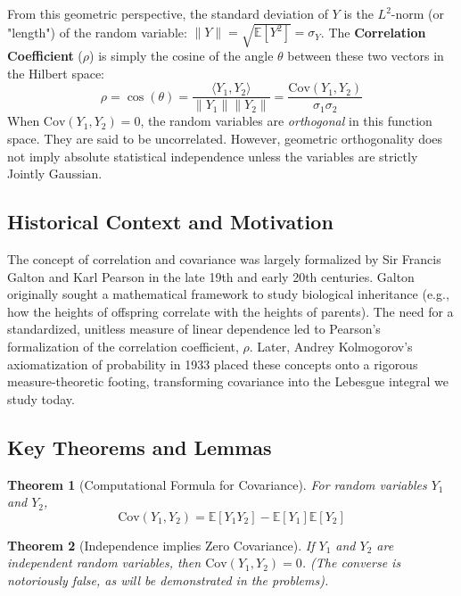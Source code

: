 \documentclass[11pt, a4paper]{article}
\newtheorem{theorem}{Theorem}[section]
\theoremstyle{definition}
\theoremstyle{remark}
\newcommand{\E}{\mathbb{E}}
\newcommand{\Cov}{\mathrm{Cov}}
\begin{document}
From this geometric perspective, the standard deviation of $Y$ is the $L^2$-norm (or "length") of the random variable: $\|Y\| = \sqrt{\E[Y^2]} = \sigma_Y$. The \textbf{Correlation Coefficient} ($\rho$) is simply the cosine of the angle $\theta$ between these two vectors in the Hilbert space:
\[
\rho = \cos(\theta) = \frac{\langle Y_1, Y_2 \rangle}{\|Y_1\| \|Y_2\|} = \frac{\Cov(Y_1, Y_2)}{\sigma_1 \sigma_2}
\]
When $\Cov(Y_1, Y_2) = 0$, the random variables are \textit{orthogonal} in this function space. They are said to be uncorrelated. However, geometric orthogonality does not imply absolute statistical independence unless the variables are strictly Jointly Gaussian.

\subsection{Historical Context and Motivation}
The concept of correlation and covariance was largely formalized by Sir Francis Galton and Karl Pearson in the late 19th and early 20th centuries. Galton originally sought a mathematical framework to study biological inheritance (e.g., how the heights of offspring correlate with the heights of parents). The need for a standardized, unitless measure of linear dependence led to Pearson's formalization of the correlation coefficient, $\rho$. Later, Andrey Kolmogorov's axiomatization of probability in 1933 placed these concepts onto a rigorous measure-theoretic footing, transforming covariance into the Lebesgue integral we study today.

\subsection{Key Theorems and Lemmas}
\begin{theorem}[Computational Formula for Covariance]
For random variables $Y_1$ and $Y_2$,
\[
\Cov(Y_1, Y_2) = \E[Y_1 Y_2] - \E[Y_1]\E[Y_2]
\]
\end{theorem}

\begin{theorem}[Independence implies Zero Covariance]
If $Y_1$ and $Y_2$ are independent random variables, then $\Cov(Y_1, Y_2) = 0$. (The converse is notoriously false, as will be demonstrated in the problems).
\end{theorem}
\end{document}

